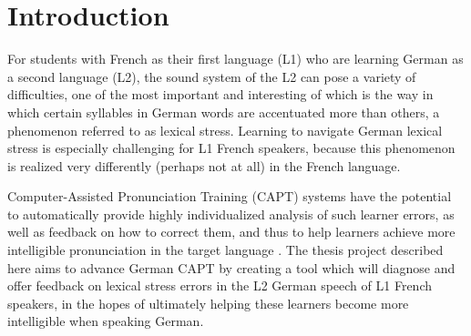 %

%
\chapter{Introduction}
\label{chap:intro}




For students with French as their first language (L1) who are learning German as a second language (L2), the sound system of the L2 can pose a variety of difficulties, one of the most important and interesting of which is the way in which certain syllables in German words are accentuated more than others, a phenomenon referred to as lexical stress. Learning to navigate German lexical stress is especially challenging for L1 French speakers, because this phenomenon is realized very differently (perhaps not at all) in the French language. 

Computer-Assisted Pronunciation Training (CAPT) systems
have the potential to automatically provide highly individualized analysis of such learner errors, as well as feedback on how to correct them, and thus to help learners achieve more intelligible 
pronunciation in the target language \citep{Witt2012}. 
%
The thesis project described here aims to advance 
German CAPT %
by creating a tool which will diagnose and offer feedback on lexical stress errors in the L2 German speech of L1 French speakers, in the hopes of ultimately helping these learners 
become more intelligible when speaking German.



